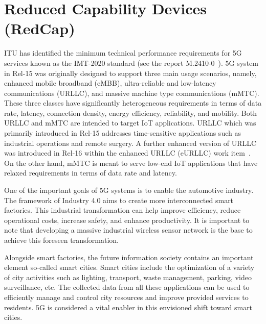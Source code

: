 \documentclass[]{IEEEtran}
\begin{document}
\section{Reduced Capability Devices (RedCap)}
\label{sec:3-RedCap-Intro}



ITU has identified the minimum technical performance requirements for 5G services known as the IMT-2020 standard (see the report M.2410-0~\cite{itu-r_minimum_2017_M.2410-0}).
5G system in Rel-15 was originally designed to support three main usage scenarios, namely, enhanced mobile broadband (eMBB), ultra-reliable and low-latency communications (URLLC), and massive machine type communications (mMTC).
These three classes have significantly heterogeneous requirements in terms of data rate, latency, connection density, energy efficiency, reliability, and mobility.
 Both URLLC and mMTC are intended to target IoT applications.
 URLLC which was primarily introduced in Rel-15 addresses time-sensitive applications such as industrial operations and remote surgery.
 A further enhanced version of URLLC was introduced in Rel-16 within the enhanced URLLC (eURLLC) work item~\cite{3gpp_study_nodate_38.824}.
 On the other hand, mMTC is meant to serve low-end IoT applications that have relaxed requirements in terms of data rate and latency.
 
One of the important goals of 5G systems is to enable the automotive industry.
The framework of Industry 4.0 aims to create more interconnected smart factories.
This industrial transformation can help improve efficiency, reduce operational costs, increase safety, and enhance productivity.
It is important to note that developing a massive industrial wireless sensor network is the base to achieve this foreseen transformation.

Alongside smart factories, the future information society contains an important element so-called smart cities. Smart cities include the optimization of a variety of city activities such as lighting, transport, waste management, parking, video surveillance, etc.
The collected data from all these applications can be used to efficiently manage and control city resources and improve provided services to residents.
5G is considered a vital enabler in this envisioned shift toward smart cities.
\end{document}
